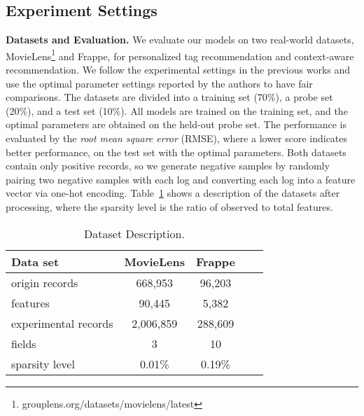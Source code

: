 \documentclass[letterpaper]{article} \usepackage{aaai19}  \usepackage{times}  \usepackage{helvet}  \usepackage{courier}  \usepackage{url}  \usepackage{graphicx}  \frenchspacing  \setlength{\pdfpagewidth}{8.5in}  \setlength{\pdfpageheight}{11in}  \usepackage{mathtools}
\begin{document}
\subsection{Experiment Settings}

\textbf{Datasets and Evaluation.} We evaluate our models on two real-world datasets, MovieLens\footnote{grouplens.org/datasets/movielens/latest}\cite{harper2015movielens} and Frappe\cite{baltrunas2015frappe}, for personalized tag recommendation and context-aware recommendation.
We follow the experimental settings in the previous works\cite{xiaoattentional,he2017neural} and use the optimal parameter settings reported by the authors to have fair comparisons. 
The datasets are divided into a training set (70\%), a probe set (20\%), and a test set (10\%). All models are trained on the training set, and the optimal parameters are obtained on the held-out probe set. The performance is evaluated by the \emph{root mean square error} (RMSE), where a lower score indicates better performance, on the test set with the optimal parameters. Both datasets contain only positive records, so we generate negative samples by randomly pairing two negative samples with each log and converting each log into a feature vector via one-hot encoding. Table~\ref{dataset_desc} shows a description of the datasets after processing, where the sparsity level is the ratio of observed to total features\cite{lee2012comparative}.

\begin{table}[t]
\caption{Dataset Description.} \label{dataset_desc}
\begin{center}
\begin{small} 
\begin{sc} 
\begin{tabular}{lcccr} 
\hline

Data set & MovieLens & Frappe\\ 
\hline 
origin records    & 668,953 & 96,203\\
features & 90,445 & 5,382\\
experimental records & 2,006,859 & 288,609 \\
fields & 3 & 10 \\ 
sparsity level & 0.01\% & 0.19\% \\
\hline \end{tabular} \end{sc} \end{small} \end{center} \end{table} 
\end{document}

